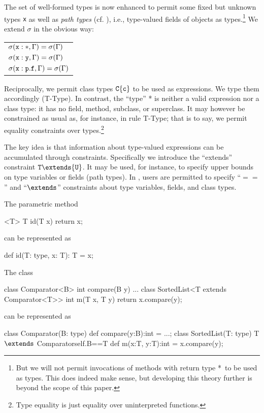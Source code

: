 The set of well-formed types is now enhanced to permit some fixed but unknown
types {\tt x} as well as \emph{path types} (cf. \cite{scala}),
i.e., type-valued fields of objects as types.\footnote{But we will not permit invocations of methods with return type *\ to be 
used as types. This does indeed make sense, but developing
this theory further is beyond the scope of this paper.} We extend $\sigma$ in the obvious way:
%
\begin{center}
\begin{tabular}{l}
$	\sigma({\tt x}:*, \Gamma)=\sigma(\Gamma)$\\
$\sigma({\tt x}:{\tt y}, \Gamma)=\sigma(\Gamma)$\\
$\sigma({\tt x}:{\tt p}.{\tt f}, \Gamma)=\sigma(\Gamma)$
\end{tabular}
\end{center}
%
Reciprocally, we permit class types ${\tt C}\{{\tt c}\}$ to be
used as expressions. We type them accordingly ({\sc T-Type}). In
contrast, the ``type'' *{} is neither a valid expression nor
a class type: it has no field, method, subclass, or superclass.
It may however be constrained as usual as, for instance, in rule
{\sc T-Type}; that is to say, we permit equality constraints over types.\footnote{Type equality is just equality over uninterpreted functions.}

The key idea is that information about type-valued expressions can
be accumulated through constraints. Specifically we introduce 
the ``extends'' constraint ${\tt T}\extends{\tt U}$. It may be used, for
instance, to specify upper bounds on type variables or fields (path
types). In \FXG{}, users are permitted to specify ``$==$'' and ``$\extends$'' constraints
about type variables, fields, and class types.

\begin{example}
The \FGJ{} parametric method

\begin{xten} 
<T> T id(T x) { return x; }
\end{xten}
\noindent can be represented as
\begin{xten} 
def id(T: type, x: T): T = x;
\end{xten}
\end{example}

\begin{example}
\noindent The \FGJ{} class 
\begin{xten} 
class Comparator<B> {
  int compare(B y) { ... } }
class SortedList<T extends Comparator<T>> { 
  int m(T x, T y) { return x.compare(y); } }
\end{xten}
\noindent can be represented as
\begin{xtenmath} 
class Comparator(B: type) {
  def compare(y:B):int = ...; }
class SortedList(T: type)
    {T $\extends$ Comparator{self.B==T}} { 
  def m(x:T, y:T):int = x.compare(y); }
\end{xtenmath}
\end{example}

